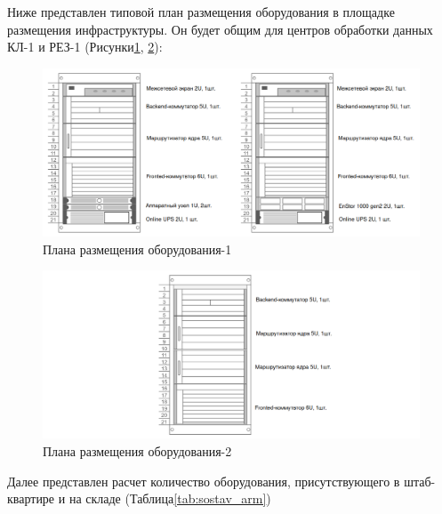 \documentclass[14pt, a4paper]{extarticle}
\begin{document}
Ниже представлен типовой план размещения оборудования в площадке
размещения инфраструктуры. Он будет общим для центров обработки данных КЛ-1
и РЕЗ-1 (Рисунки\;\ref{fig:server_plan}, \ref{fig:server_plan2}):



\begin{figure}[H]
\centering
\includegraphics[scale=0.38]{server_plan1}
\caption{Плана размещения оборудования-1\label{fig:server_plan}}
\end{figure}

\begin{figure}[H]
\centering
\includegraphics[scale=0.38]{server_plan2}
\caption{Плана размещения оборудования-2\label{fig:server_plan2}}
\end{figure}




Далее представлен расчет количество оборудования, присутствующего в штаб-квартире и на складе (Таблица\;\ref{tab:sostav_arm})
\end{document}
